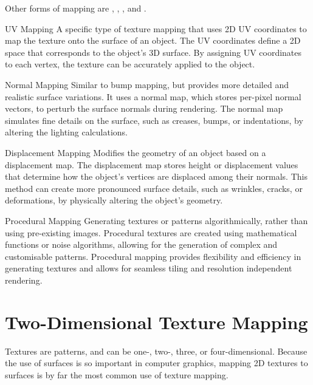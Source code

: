 \documentclass[../COS3712_Notes.tex]{subfiles}
\begin{document}
      Other forms of mapping are , ,
      , and .

      \begin{definition}{UV Mapping}
        A specific type of texture mapping that uses 2D UV coordinates to map the texture
        onto the surface of an object.
        The UV coordinates define a 2D space that corresponds to the object's 3D surface.
        By assigning UV coordinates to each vertex, the texture can be accurately applied
        to the object.
      \end{definition}

      \begin{definition}{Normal Mapping}
        Similar to bump mapping, but provides more detailed and realistic surface variations.
        It uses a normal map, which stores per-pixel normal vectors, to perturb the surface normals
        during rendering.
        The normal map simulates fine details on the surface, such as creases, bumps,
        or indentations, by altering the lighting calculations.
      \end{definition}

      \begin{definition}{Displacement Mapping}
        Modifies the geometry of an object based on a displacement map.
        The displacement map stores height or displacement values that determine how the object's
        vertices are displaced among their normals.
        This method can create more pronounced surface details, such as wrinkles,
        cracks, or deformations, by physically altering the object's geometry.
      \end{definition}

      \begin{definition}{Procedural Mapping}
        Generating textures or patterns algorithmically, rather than using pre-existing images.
        Procedural textures are created using mathematical functions or noise algorithms,
        allowing for the generation of complex and customisable patterns.
        Procedural mapping provides flexibility and efficiency in generating textures
        and allows for seamless tiling and resolution independent rendering.
      \end{definition}

    \section{Two-Dimensional Texture Mapping}
      Textures are patterns, and can be one-, two-, three, or four-dimensional.
      Because the use of surfaces is so important in computer graphics,
      mapping 2D textures to surfaces is by far the most common use of texture mapping.
\end{document}
